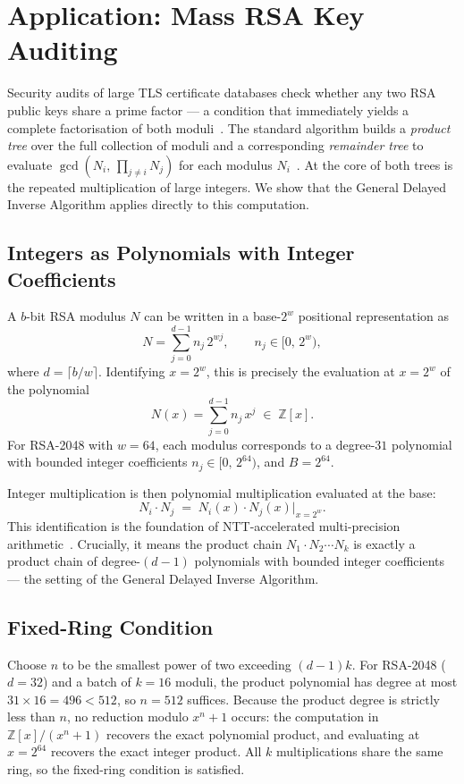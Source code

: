 \documentclass[runningheads]{llncs}
\begin{document}



\section{Application: Mass RSA Key Auditing}

Security audits of large TLS certificate databases check whether any two RSA public keys share a prime factor --- a condition that immediately yields a complete factorisation of both moduli~\cite{heninger2012mining}. The standard algorithm builds a \emph{product tree} over the full collection of moduli and a corresponding \emph{remainder tree} to evaluate $\gcd(N_i,\, \prod_{j \neq i} N_j)$ for each modulus $N_i$~\cite{bernstein2004smooth}. At the core of both trees is the repeated multiplication of large integers. We show that the General Delayed Inverse Algorithm applies directly to this computation.

\subsection*{Integers as Polynomials with Integer Coefficients}

A $b$-bit RSA modulus $N$ can be written in a base-$2^w$ positional representation as
$$N = \sum_{j=0}^{d-1} n_j\, 2^{wj}, \qquad n_j \in [0,\, 2^w),$$
where $d = \lceil b/w \rceil$. Identifying $x = 2^w$, this is precisely the evaluation at $x = 2^w$ of the polynomial
$$N(x) = \sum_{j=0}^{d-1} n_j\, x^j \;\in\; \mathbb{Z}[x].$$
For RSA-2048 with $w = 64$, each modulus corresponds to a degree-$31$ polynomial with bounded integer coefficients $n_j \in [0,\, 2^{64})$, and $B = 2^{64}$.

Integer multiplication is then polynomial multiplication evaluated at the base:
$$N_i \cdot N_j \;=\; N_i(x) \cdot N_j(x)\big|_{x=2^w}.$$
This identification is the foundation of NTT-accelerated multi-precision arithmetic~\cite{schonhage1971}. Crucially, it means the product chain $N_1 \cdot N_2 \cdots N_k$ is exactly a product chain of degree-$(d{-}1)$ polynomials with bounded integer coefficients --- the setting of the General Delayed Inverse Algorithm.

\subsection*{Fixed-Ring Condition}

Choose $n$ to be the smallest power of two exceeding $(d-1)k$. For RSA-2048 ($d = 32$) and a batch of $k = 16$ moduli, the product polynomial has degree at most $31 \times 16 = 496 < 512$, so $n = 512$ suffices. Because the product degree is strictly less than $n$, no reduction modulo $x^n + 1$ occurs: the computation in $\mathbb{Z}[x]/(x^n+1)$ recovers the exact polynomial product, and evaluating at $x = 2^{64}$ recovers the exact integer product. All $k$ multiplications share the same ring, so the fixed-ring condition is satisfied.
\end{document}
